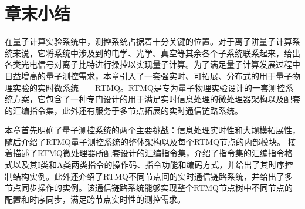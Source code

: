 




\newpage
\section[章末小结]{章末小结}

在量子计算实验系统中，测控系统占据着十分关键的位置。对于离子阱量子计算系统来说，它将系统中涉及到的电学、光学、真空等其余各个子系统联系起来，给出各类光电信号对离子比特进行操控以实现量子计算。为了满足量子计算发展过程中日益增高的量子测控需求，本章引入了一套强实时、可拓展、分布式的用于量子物理实验的实时微系统——RTMQ。RTMQ是专为量子物理实验设计的一套测控系统方案，它包含了一种专门设计的用于满足实时信息处理的微处理器架构以及配套的汇编指令集，此外还有服务于多节点拓展的实时通信链路系统。

本章首先明确了量子测控系统的两个主要挑战：信息处理实时性和大规模拓展性，
随后介绍了RTMQ量子测控系统的整体架构以及每个RTMQ节点的内部模块。
接着描述了RTMQ微处理器所配套设计的汇编指令集，介绍了指令集的汇编指令格式以及其I类和A类两类指令的操作码、指令功能和编码方式，并给出了其时序控制结构实例。此外还介绍了RTMQ不同节点间的实时通信链路系统，并给出了多节点同步操作的实例。该通信链路系统能够实现整个RTMQ节点树中不同节点的配置和时序同步，满足跨节点实时性的测控需求。

